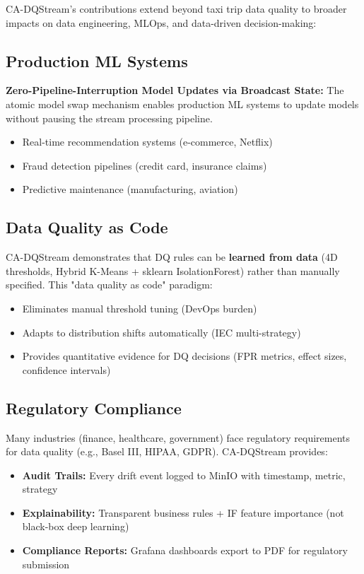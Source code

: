 CA-DQStream's contributions extend beyond taxi trip data quality to broader impacts on data engineering, MLOps, and data-driven decision-making:

\subsection{Production ML Systems}

\textbf{Zero-Pipeline-Interruption Model Updates via Broadcast State:} The atomic model swap mechanism enables production ML systems to update models without pausing the stream processing pipeline.
\begin{itemize}
    \item Real-time recommendation systems (e-commerce, Netflix)
    \item Fraud detection pipelines (credit card, insurance claims)
    \item Predictive maintenance (manufacturing, aviation)
\end{itemize}

\subsection{Data Quality as Code}

CA-DQStream demonstrates that DQ rules can be \textbf{learned from data} (4D thresholds, Hybrid K-Means + sklearn IsolationForest) rather than manually specified. This "data quality as code" paradigm:
\begin{itemize}
    \item Eliminates manual threshold tuning (DevOps burden)
    \item Adapts to distribution shifts automatically (IEC multi-strategy)
    \item Provides quantitative evidence for DQ decisions (FPR metrics, effect sizes, confidence intervals)
\end{itemize}

\subsection{Regulatory Compliance}

Many industries (finance, healthcare, government) face regulatory requirements for data quality (e.g., Basel III, HIPAA, GDPR). CA-DQStream provides:
\begin{itemize}
    \item \textbf{Audit Trails:} Every drift event logged to MinIO with timestamp, metric, strategy
    \item \textbf{Explainability:} Transparent business rules + IF feature importance (not black-box deep learning)
    \item \textbf{Compliance Reports:} Grafana dashboards export to PDF for regulatory submission
\end{itemize}

